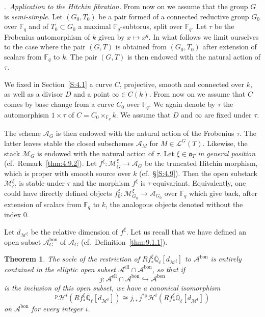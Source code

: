 \documentclass[12pt,a4paper,oneside,english,leqno]{smfart}
\makeatletter
\numberwithin{equation}{subsection}
\newcounter{theo}
\numberwithin{theo}{subsection}
\newenvironment{paragr}[1][]{\medskip\refstepcounter{subsection}%
  \par\noindent\hspace*{\parindent}\thesubsection.\ \emph{#1}%
  \@ifundefined{@empty}{}{}\ignorespaces}{\medskip}
\theoremstyle{plain}
\newtheorem{theorem}[theo]{Theorem}
\theoremstyle{definition}
\theoremstyle{remark}
\DeclareMathOperator{\el}{ell}
\newcommand{\Fq}{\mathbb{F}_q}
\newcommand{\Qlb}{\overline{\mathbb{Q}}_{\ell}}
\newcommand{\mc}{\mathcal{M}}
\newcommand{\lc}{\mathcal{L}}
\newcommand{\hc}{\mathcal{H}}
\newcommand{\Ac}{\mathcal{A}}
\newcommand{\ago}{\mathfrak{a}}
\makeatother
\begin{document}
\begin{paragr}[Application to the Hitchin fibration.]\label{S:10.5}
From now on we assume that the group $G$ is \emph{semi-simple}. Let $(G_0,T_0)$ be a pair formed of a connected reductive group $G_0$ over $\Fq$ and of $T_0\subset G_0$ a maximal $\Fq$-subtorus, split over $\Fq$. Let $\tau$ be the Frobenius automorphism of $k$ given by $x\mapsto x^q$. In what follows we limit ourselves to the case where the pair $(G,T)$ is obtained from $(G_0,T_0)$ after extension of scalars from $\Fq$ to $k$. The pair $(G,T)$ is then endowed with the natural action of $\tau$.

We fixed in Section~\ref{S:4.1} a curve $C$, projective, smooth and connected over $k$, as well as a divisor $D$ and a point $\infty\in C(k)$. From now on we assume that $C$ comes by base change from a curve $C_0$ over $\Fq$. We again denote by $\tau$ the automorphism $1\times\tau$ of $C = C_0\times_{\Fq}k$. We assume that $D$ and $\infty$ are fixed under $\tau$.

The scheme $\Ac_G$ is then endowed with the natural action of the Frobenius $\tau$. The latter leaves stable the closed subschemes $\Ac_M$ for $M\in\lc^G(T)$. Likewise, the stack $\mc_G$ is endowed with the natural action of $\tau$. Let $\xi\in\ago_T$ \emph{in general position} (cf.\ Remark~\ref{thm:4.9.2}). Let $f^\xi : \mc_G^\xi\to\Ac_G$ be the truncated Hitchin morphism, which is proper with smooth source over $k$ (cf.\ \S\ref{S:4.9}). Then the open substack $\mc_G^\xi$ is stable under $\tau$ and the morphism $f^\xi$ is $\tau$-equivariant. Equivalently, one could have directly defined objects $f_0^\xi : \mc_{G_0}^\xi\to\Ac_{G_0}$ over $\Fq$ which give back, after extension of scalars from $\Fq$ to $k$, the analogous objects denoted without the index $0$.

Let $d_{\mc^\xi}$ be the relative dimension of $f^\xi$. Let us recall that we have defined an open subset $\Ac_G^{\mathrm{bon}}$ of $\Ac_G$ (cf.\ Definition~\ref{thm:9.1.1}).

\begin{theorem}\label{thm:10.5.1}
The socle of the restriction of $Rf^\xi_*\Qlb[d_{\mc^\xi}]$ to $\Ac^{\mathrm{bon}}$ is entirely contained in the elliptic open subset $\Ac^{\el}\cap\Ac^{\mathrm{bon}}$, so that if
$$j : \Ac^{\el}\cap\Ac^{\mathrm{bon}}\hookrightarrow\Ac^{\mathrm{bon}}$$
is the inclusion of this open subset, we have a canonical isomorphism
$${}^{\mathrm{p}}\hc^i(Rf^\xi_*\Qlb[d_{\mc^\xi}])\cong j_{!*}j^{*\mathrm{p}}\hc^i(Rf^\xi_*\Qlb[d_{\mc^\xi}])$$
on $\Ac^{\mathrm{bon}}$ for every integer $i$.
\end{theorem}


\end{paragr}
\end{document}
